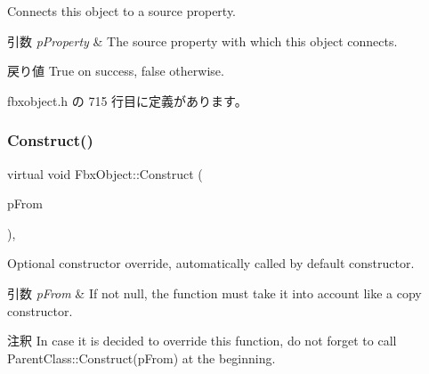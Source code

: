 Connects this object to a source property. 
\begin{DoxyParams}{引数}
{\em p\+Property} & The source property with which this object connects. \\
\hline
\end{DoxyParams}
\begin{DoxyReturn}{戻り値}
{\ttfamily True} on success, {\ttfamily false} otherwise. 
\end{DoxyReturn}


 fbxobject.\+h の 715 行目に定義があります。

\mbox{\label{class_fbx_object_a313503bc645af3fdceb4a99ef5cea7eb}} 
\subsubsection{\texorpdfstring{Construct()}{Construct()}}
{\footnotesize\ttfamily virtual void Fbx\+Object\+::\+Construct (\begin{DoxyParamCaption}\item[{const \hyperlink{class_fbx_object}{Fbx\+Object} $\ast$}]{p\+From }\end{DoxyParamCaption})\hspace{0.3cm}{\ttfamily [protected]}, {\ttfamily [virtual]}}

Optional constructor override, automatically called by default constructor. 
\begin{DoxyParams}{引数}
{\em p\+From} & If not null, the function must take it into account like a copy constructor. \\
\hline
\end{DoxyParams}
\begin{DoxyRemark}{注釈}
In case it is decided to override this function, do not forget to call Parent\+Class\+::\+Construct(p\+From) at the beginning. 
\end{DoxyRemark}


